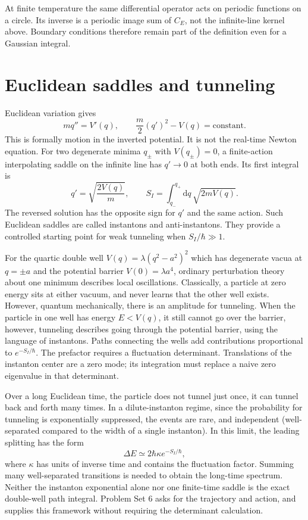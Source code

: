 \documentclass[11pt]{article}
\newcommand{\dd}{\mathrm d}
\newcommand{\module}[1]{\clearpage\section{#1}}
\begin{document}
At finite temperature the same differential operator acts on periodic
functions on a circle. Its inverse is a periodic image sum of
\(C_E\), not the infinite-line kernel above. Boundary conditions
therefore remain part of the definition even for a Gaussian integral.

\module{Euclidean saddles and tunneling}
Euclidean variation gives
\begin{equation}
 m q''=V'(q),\qquad
 \frac m2(q')^2-V(q)=\text{constant}.                \label{eq:euclmotion}
\end{equation}
This is formally motion in the inverted potential. It is not the
real-time Newton equation. For two degenerate minima \(q_\pm\) with
\(V(q_\pm)=0\), a finite-action interpolating saddle on the infinite
line has \(q'\to0\) at both ends. Its first integral is
\begin{equation}
 q'=\sqrt{\frac{2V(q)}{m}},\qquad
 S_I=\int_{q_-}^{q_+}\dd q\,\sqrt{2mV(q)}.           \label{eq:instanton}
\end{equation}
The reversed solution has the opposite sign for \(q'\) and the same
action. Such Euclidean saddles are called instantons and anti-instantons.
They provide a controlled starting point for weak tunneling when
\(S_I/\hbar\gg1\).

For the quartic double well \(V(q)=\lambda(q^2-a^2)^2\) which has degenerate vacua at $q=\pm a$ and the potential barrier $V(0)=\lambda a^4$, ordinary
perturbation theory about one minimum describes local oscillations.
Classically, a particle at zero energy sits at either vacuum, and never learns that the other well exists. However, quantum mechanically, there is an amplitude for tunneling. When the particle in one well has energy $E<V(q)$, it still cannot go over the barrier, however, tunneling describes going through the potential barrier, using the language of instantons.
Paths connecting the wells add contributions proportional to
\(e^{-S_I/\hbar}\). The prefactor requires a fluctuation determinant.
Translations of the instanton center are a zero mode; its integration
must replace a naive zero eigenvalue in that determinant.

Over a long Euclidean time, the particle does not tunnel just once, it can tunnel back and forth many times. In a dilute-instanton regime, since the probability for tunneling is exponentially suppressed, the events are rare, and independent (well-separated compared to the width of a single instanton). In this limit, the leading splitting has the form
\begin{equation}
 \Delta E\simeq2\hbar\kappa e^{-S_I/\hbar},
\end{equation}
where \(\kappa\) has units of inverse time and contains the fluctuation
factor. Summing many well-separated transitions is needed to obtain
the long-time spectrum. Neither the instanton exponential alone nor
one finite-time saddle is the exact double-well path integral. Problem
Set 6 asks for the trajectory and action, and supplies this framework
without requiring the determinant calculation.
\end{document}
